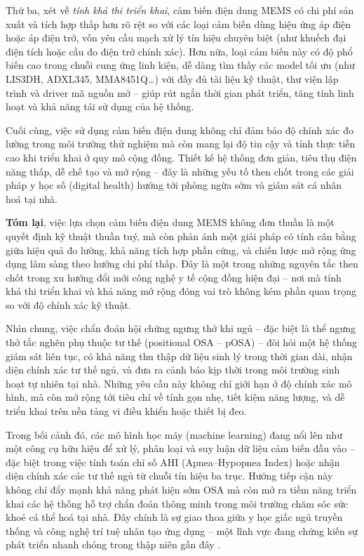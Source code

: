 Thứ ba, xét về \textit{tính khả thi triển khai}, cảm biến điện dung 
MEMS có chi phí sản xuất và tích hợp thấp hơn rõ rệt so với các loại 
cảm biến dùng hiệu ứng áp điện hoặc áp điện trở, vốn yêu cầu mạch xử 
lý tín hiệu chuyên biệt (như khuếch đại điện tích hoặc cầu đo điện 
trở chính xác). Hơn nữa, loại cảm biến này có độ phổ biến cao trong 
chuỗi cung ứng linh kiện, dễ dàng tìm thấy các model tối ưu 
(như LIS3DH, ADXL345, MMA8451Q\ldots) với đầy đủ tài liệu kỹ thuật, 
thư viện lập trình và driver mã nguồn mở – giúp rút ngắn thời gian 
phát triển, tăng tính linh hoạt và khả năng tái sử dụng của hệ thống.

Cuối cùng, việc sử dụng cảm biến điện dung không chỉ đảm bảo độ 
chính xác đo lường trong môi trường thử nghiệm mà còn mang lại 
độ tin cậy và tính thực tiễn cao khi triển khai ở quy mô cộng đồng. 
Thiết kế hệ thống đơn giản, tiêu thụ điện năng thấp, dễ chế tạo và 
mở rộng – đây là những yếu tố then chốt trong các giải pháp y học số 
(digital health) hướng tới phòng ngừa sớm và giám sát cá nhân hoá tại 
nhà.

\textbf{Tóm lại}, việc lựa chọn cảm biến điện dung MEMS không đơn thuần là một quyết định kỹ thuật thuần tuý, mà còn phản ánh một giải pháp có tính cân bằng giữa hiệu quả đo lường, khả năng tích hợp phần cứng, và chiến lược mở rộng ứng dụng lâm sàng theo hướng chi phí thấp. Đây là một trong những nguyên tắc then chốt trong xu hướng đổi mới công nghệ y tế cộng đồng hiện đại – nơi mà tính khả thi triển khai và khả năng mở rộng đóng vai trò không kém phần quan trọng so với độ chính xác kỹ thuật.

\vspace{1em}

Nhìn chung, việc chẩn đoán hội chứng ngưng thở khi ngủ – đặc biệt là thể ngưng thở tắc nghẽn phụ thuộc tư thế (positional OSA – pOSA) – đòi hỏi một hệ thống giám sát liên tục, có khả năng thu thập dữ liệu sinh lý trong thời gian dài, nhận diện chính xác tư thế ngủ, và đưa ra cảnh báo kịp thời trong môi trường sinh hoạt tự nhiên tại nhà. Những yêu cầu này không chỉ giới hạn ở độ chính xác mô hình, mà còn mở rộng tới tiêu chí về tính gọn nhẹ, tiết kiệm năng lượng, và dễ triển khai trên nền tảng vi điều khiển hoặc thiết bị đeo. 

Trong bối cảnh đó, các mô hình học máy (machine learning) đang nổi lên như một công cụ hữu hiệu để xử lý, phân loại và suy luận dữ liệu cảm biến đầu vào – đặc biệt trong việc tính toán chỉ số AHI (Apnea–Hypopnea Index) hoặc nhận diện chính xác các tư thế ngủ từ chuỗi tín hiệu ba trục. Hướng tiếp cận này không chỉ đẩy mạnh khả năng phát hiện sớm OSA mà còn mở ra tiềm năng triển khai các hệ thống hỗ trợ chẩn đoán thông minh trong môi trường chăm sóc sức khoẻ cá thể hoá tại nhà. 
Đây chính là sự giao thoa giữa y học giấc ngủ truyền thống và công nghệ trí tuệ nhân tạo ứng dụng – một lĩnh vực đang chứng kiến sự phát triển nhanh chóng trong thập niên gần đây \cite{osa_sanchez2025}.

